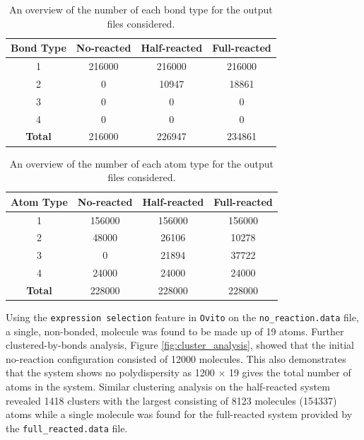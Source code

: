 \documentclass[10pt,a4paper]{labreport}
\begin{document}
\begin{enumerate}
  \begin{table}[h]
    \caption{An overview of the number of each bond type for the output files considered.}
    \label{tab:ass1_lammps-bonds}
    \centering
    \begin{tabular}{cccc}
      \hline
    \textbf{Bond Type}      & \textbf{No-reacted}     & \textbf{Half-reacted}   & \textbf{Full-reacted}   \\
    \hline
    1 & 216000 & 216000 & 216000 \\
    2 & 0      & 10947  & 18861  \\
    3 & 0      & 0      & 0      \\
    4 & 0      & 0      & 0      \\ \hline
    \textbf{Total} & 216000 & 226947 & 234861 \\ \hline
    \end{tabular}
  \end{table}

  \begin{table}[h]
    \caption{An overview of the number of each atom type for the output files considered.}
    \label{tab:ass1_lammps-atoms}
    \centering
    \begin{tabular}{cccc}
      \hline
    \textbf{Atom Type}      & \textbf{No-reacted}     & \textbf{Half-reacted}   & \textbf{Full-reacted}   \\
    \hline
    1 & 156000 & 156000 & 156000 \\
    2 & 48000  & 26106  & 10278  \\
    3 & 0      & 21894  & 37722  \\
    4 & 24000  & 24000  & 24000  \\ \hline
    \textbf{Total} & 228000 & 228000 & 228000 \\ \hline
    \end{tabular}
  \end{table}
  
  Using the \texttt{expression selection} feature in \texttt{Ovito} on the \texttt{no\_reaction.data} file, a single, non-bonded, molecule was found to be made up of 19 atoms. Further clustered-by-bonds analysis, Figure \ref{fig:cluster_analysis}, showed that the initial no-reaction configuration consisted of 12000 molecules. This also demonstrates that the system shows no polydispersity as 1200 $\times$ 19 gives the total number of atoms in the system. Similar clustering analysis on the half-reacted system revealed 1418 clusters with the largest consisting of 8123 molecules (154337) atoms while a single molecule was found for the full-reacted system provided by the \texttt{full\_reacted.data} file. 


\end{enumerate}
\end{document}
